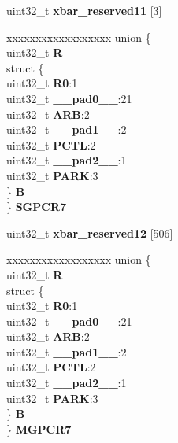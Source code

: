 \begin{DoxyCompactItemize}
\begin{tabbing}
\end{tabbing}\item 
\mbox{\label{structXBAR__tag_a69ba244bdd952cc82fb75f0de6af0b4f}} 
uint32\+\_\+t {\bfseries xbar\+\_\+reserved11} \mbox{[}3\mbox{]}
\item 
\mbox{\label{structXBAR__tag_a517b678f2595c8a4c40f62f5e4dbb3d5}} 
\begin{tabbing}
xx\=xx\=xx\=xx\=xx\=xx\=xx\=xx\=xx\=\kill
union \{\\
\>uint32\_t {\bfseries R}\\
\>struct \{\\
\>\>uint32\_t {\bfseries R0}:1\\
\>\>uint32\_t {\bfseries \_\_pad0\_\_}:21\\
\>\>uint32\_t {\bfseries ARB}:2\\
\>\>uint32\_t {\bfseries \_\_pad1\_\_}:2\\
\>\>uint32\_t {\bfseries PCTL}:2\\
\>\>uint32\_t {\bfseries \_\_pad2\_\_}:1\\
\>\>uint32\_t {\bfseries PARK}:3\\
\>\} {\bfseries B}\\
\} {\bfseries SGPCR7}\\

\end{tabbing}\item 
\mbox{\label{structXBAR__tag_a1db9f57f21899c695fd5ffbd3cda213c}} 
uint32\+\_\+t {\bfseries xbar\+\_\+reserved12} \mbox{[}506\mbox{]}
\item 
\mbox{\label{structXBAR__tag_a834ee1101a4c7371d0fd5da23237b2d0}} 
\begin{tabbing}
xx\=xx\=xx\=xx\=xx\=xx\=xx\=xx\=xx\=\kill
union \{\\
\>uint32\_t {\bfseries R}\\
\>struct \{\\
\>\>uint32\_t {\bfseries R0}:1\\
\>\>uint32\_t {\bfseries \_\_pad0\_\_}:21\\
\>\>uint32\_t {\bfseries ARB}:2\\
\>\>uint32\_t {\bfseries \_\_pad1\_\_}:2\\
\>\>uint32\_t {\bfseries PCTL}:2\\
\>\>uint32\_t {\bfseries \_\_pad2\_\_}:1\\
\>\>uint32\_t {\bfseries PARK}:3\\
\>\} {\bfseries B}\\
\} {\bfseries MGPCR7}\\


\end{tabbing}
\end{DoxyCompactItemize}
